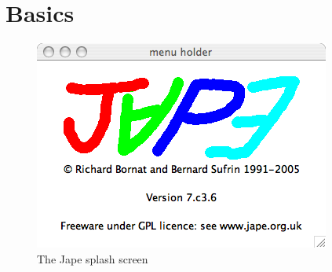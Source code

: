 \documentclass[11pt]{book}
\begin{document}
\tableofcontents

\chapter{Basics}


\begin{figure}
\centering
\includegraphics[scale=0.5]{pics/splashscreen.png}
\caption{The Jape splash screen}
\label{fig:splashscreen}
\end{figure}
\end{document}
